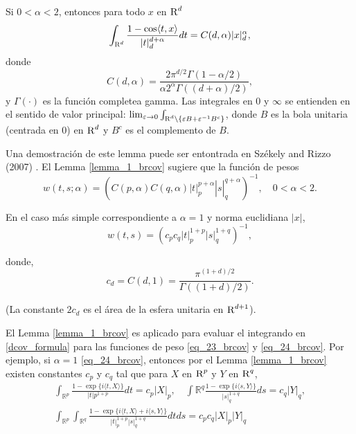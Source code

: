 	\begin{lem}\label{lemma_1_brcov}
		Si $0<\alpha<2$, entonces para todo $x$ en $\textsc{R}^d$
		$$
		\int_{\textsc{R}^d} \frac{1-\cos \langle t, x\rangle}{|t|_d^{d+\alpha}} d t=C(d, \alpha)|x|_d^\alpha,
		$$
		donde
		$$
		C(d, \alpha)=\frac{2 \pi^{d / 2} \Gamma(1-\alpha / 2)}{\alpha 2^\alpha \Gamma((d+\alpha) / 2)},
		$$
		y $\Gamma(\cdot)$ es la funci\'on completea gamma. Las integrales en 0 y $\infty$ se entienden en el sentido de valor principal: $\lim_{\varepsilon \rightarrow 0} \int_{\textsc{R}^d \backslash\left\{\varepsilon B+\varepsilon^{-1} B^c\right\}}$, donde $B$ es la bola unitaria (centrada en 0) en $\textsc{R}^d$ y $B^c$ es el complemento de $B$.
	\end{lem}
	Una demostraci\'on de este lemma puede ser entontrada en Székely and Rizzo (2007) \cite{Szekely2007}. El Lemma \ref{lemma_1_brcov}
	sugiere que la funci\'on de pesos
	\begin{equation}\label{eq_23_brcov}
	w(t, s ; \alpha)=\left(\left.\left.C(p, \alpha) C(q, \alpha)|t|_p^{p+\alpha}\right|s\right|_q ^{q+\alpha}\right)^{-1}, \quad 0<\alpha<2 .	
	\end{equation}

	En el caso m\'as simple correspondiente a $\alpha=1$ y norma euclidiana $|x|$,
	\begin{equation}\label{eq_24_brcov}
		w(t, s)=\left(c_p c_q|t|_p^{1+p}|s|_q^{1+q}\right)^{-1},
		\end{equation}
	
	donde,
	\begin{equation}\label{eq_25_brcov}
		c_d=C(d, 1)=\frac{\pi^{(1+d) / 2}}{\Gamma((1+d) / 2)} .
	\end{equation}
	
	(La constante $2 c_d$ es el \'area de la esfera unitaria en $\textsc{R}^{d+1}$).
	\begin{rem}
		El Lemma \ref{lemma_1_brcov} es aplicado para evaluar el integrando en \ref{dcov_formula} para las funciones de peso \ref{eq_23_brcov} y \ref{eq_24_brcov}. Por ejemplo, si $\alpha=1$ \ref{eq_24_brcov}, entonces por el Lemma \ref{lemma_1_brcov} existen constantes $c_p$ y $c_q$ tal que para $X$ en $\textsc{R}^p$ y $Y$ en $\textsc{R}^q$,
		$$
		\begin{gathered}
		\int_{\mathbb{R}^p} \frac{1-\exp \{i\langle t, X\rangle\}}{|t|p^{1+p}} d t=c_p|X|_p, \quad \int{\mathbb{R}^q} \frac{1-\exp \{i\langle s, Y\rangle\}}{|s|_q^{1+q}} d s=c_q|Y|_q, \\
		\int_{\mathbb{R}^p} \int_{\mathbb{R}^q} \frac{1-\exp \{i\langle t, X\rangle+i\langle s, Y\rangle\}}{|t|_p^{1+p}|s|_q^{1+q}} d t d s=c_p c_q|X|_p|Y|_q
		\end{gathered}
		$$
	\end{rem}
	
